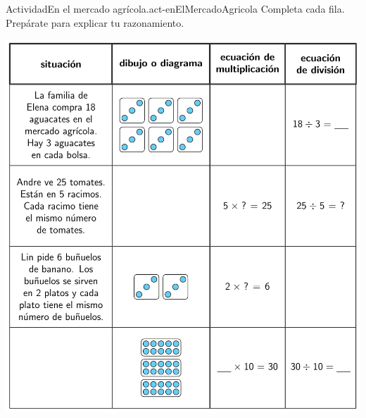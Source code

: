\documentclass[14pt]{extarticle}
\begin{document}
\begin{activity}{Actividad}{En el mercado agrícola.}{act-enElMercadoAgricola}%
Completa cada fila. Prepárate para explicar tu razonamiento.%
\begin{image}{0}{1}{0}{-0.2cm}%
\includegraphics[scale=1, max width=\linewidth, center]{external/blm/tikz-source/enElMercadoAgricola-blm-tab.pdf}
\end{image}%
\end{activity}
\end{document}
